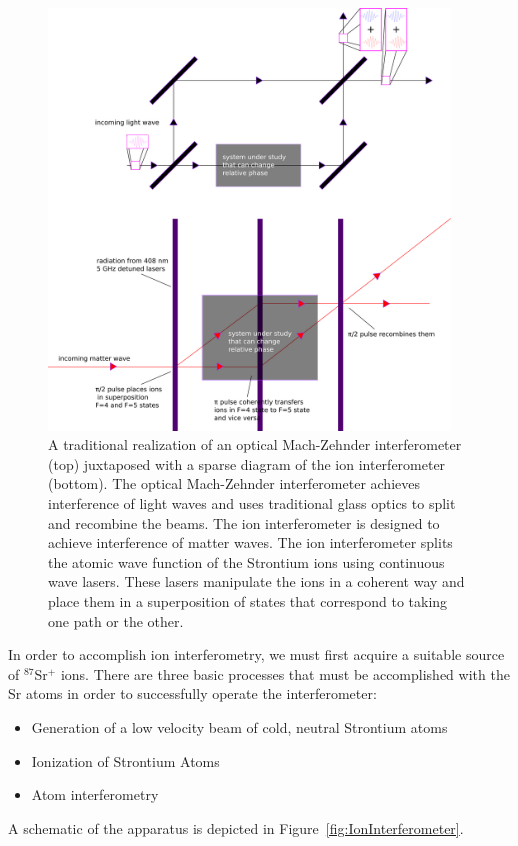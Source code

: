 \begin{figure}
\centerline{
\includegraphics[width=0.95\textwidth]{mach-zehnder}}
\caption[Optical and matter wave Mach-Zehnder interferometers]{\label{mach-zehnder-fig}A traditional realization of an optical Mach-Zehnder interferometer (top) juxtaposed with a sparse diagram of the ion interferometer (bottom). The optical Mach-Zehnder interferometer achieves interference of light waves and uses traditional glass optics to split and recombine the beams. The ion interferometer is designed to achieve interference of matter waves. The ion interferometer splits the atomic wave function of the Strontium ions using continuous wave lasers. These lasers manipulate the ions in a coherent way and place them in a superposition of states that correspond to taking one path or the other.}
\end{figure}

In order to accomplish ion interferometry, we must first acquire a suitable source of $^{87}$Sr$^+$ ions. There are three basic processes that must be accomplished with the Sr atoms in order to successfully operate the interferometer: 
\begin{itemize}
\item Generation of a low velocity beam of cold, neutral Strontium atoms   
\item Ionization of Strontium Atoms
\item Atom interferometry
\end{itemize} 
A schematic of the apparatus is depicted in Figure~\ref{fig:IonInterferometer}.

